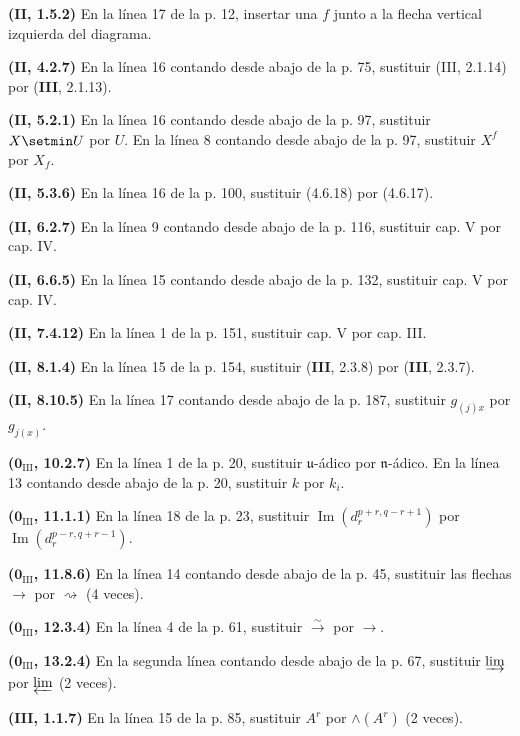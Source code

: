 \noindent\textbf{(II, 1.5.2)} En la línea 17 de la p. 12, insertar una $f$
junto a la flecha vertical izquierda del diagrama.

\noindent\textbf{(II, 4.2.7)} En la línea 16 contando desde abajo de la p. 75,
sustituir (III, 2.1.14) por (\textbf{III}, 2.1.13).

\noindent\textbf{(II, 5.2.1)} En la línea 16 contando desde abajo de la p. 97,
sustituir $X\setmin U$ por $U$. En la línea 8 contando desde abajo de la p. 97,
sustituir $X^f$ por $X_f$.

\noindent\textbf{(II, 5.3.6)} En la línea 16 de la p. 100, sustituir (4.6.18)
por (4.6.17).

\noindent\textbf{(II, 6.2.7)} En la línea 9 contando desde abajo de la p. 116,
sustituir cap. V por cap. IV.

\noindent\textbf{(II, 6.6.5)} En la línea 15 contando desde abajo de la p.
132, sustituir cap. V por cap. IV.

\noindent\textbf{(II, 7.4.12)} En la línea 1 de la p. 151, sustituir cap. V
por cap. III.

\noindent\textbf{(II, 8.1.4)} En la línea 15 de la p. 154, sustituir (\textbf{III},
2.3.8) por (\textbf{III}, 2.3.7).

\noindent\textbf{(II, 8.10.5)} En la línea 17 contando desde abajo de la p.
187, sustituir $g_{(j)x}$ por $g_{j(x)}$.

\noindent\textbf{($\mathbf{0}_{\mathrm{III}}$, 10.2.7)} En la línea 1 de la p. 20,
sustituir $\mathfrak u$-ádico por $\mathfrak n$-ádico. En la línea 13 contando desde abajo
de la p. 20, sustituir $k$ por $k_i$.

\noindent\textbf{($\mathbf{0}_{\mathrm{III}}$, 11.1.1)} En la línea 18 de la p. 23,
sustituir $\operatorname{Im}(d_r^{p+r,q-r+1})$ por
$\operatorname{Im}(d_r^{p-r,q+r-1})$.

\noindent\textbf{($\mathbf{0}_{\mathrm{III}}$, 11.8.6)} En la línea 14 contando desde
abajo de la p. 45, sustituir las flechas $\to$ por $\rightsquigarrow$ (4 veces).

\noindent\textbf{($\mathbf{0}_{\mathrm{III}}$, 12.3.4)} En la línea 4 de la p. 61,
sustituir $\xrightarrow{\sim}$ por $\to$.

\noindent\textbf{($\mathbf{0}_{\mathrm{III}}$, 13.2.4)} En la segunda línea contando
desde abajo de la p. 67, sustituir $\varinjlim$ por $\varprojlim$ (2 veces).

\noindent\textbf{(III, 1.1.7)} En la línea 15 de la p. 85, sustituir $A^r$ por
$\wedge(A^r)$ (2 veces).

